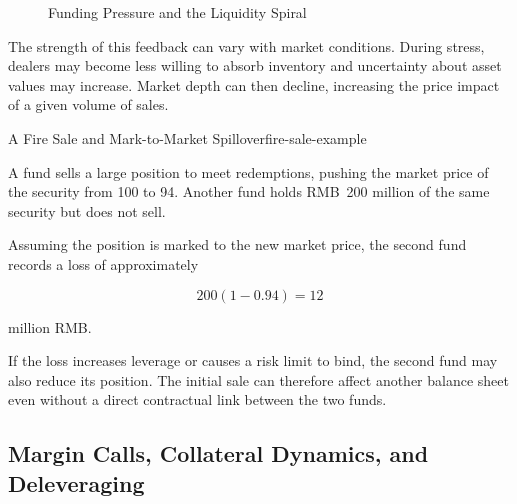 \begin{figure}[htbp]
\centering
{}

\caption{Funding Pressure and the Liquidity Spiral}
\label{fig:ch21-liquidity-spiral}
\end{figure}

The strength of this feedback can vary with market conditions. During stress, dealers may become less willing to absorb inventory and uncertainty about asset values may increase. Market depth can then decline, increasing the price impact of a given volume of sales.

\begin{example}{A Fire Sale and Mark-to-Market Spillover}{fire-sale-example}

A fund sells a large position to meet redemptions, pushing the market price of the security from 100 to 94. Another fund holds RMB~200 million of the same security but does not sell.

Assuming the position is marked to the new market price, the second fund records a loss of approximately

\[
200(1-0.94)=12
\]

million RMB.

If the loss increases leverage or causes a risk limit to bind, the second fund may also reduce its position. The initial sale can therefore affect another balance sheet even without a direct contractual link between the two funds.

\end{example}

\subsection{Margin Calls, Collateral Dynamics, and Deleveraging}

